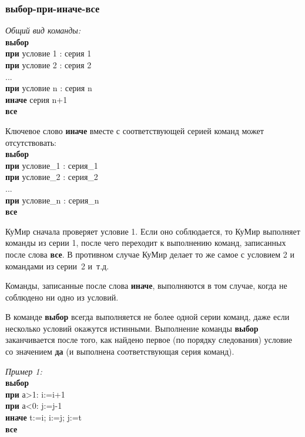 \subsubsection{выбор-при-иначе-все}

\emph{Общий вид команды:}\\
{\sffamily
\textbf{выбор}\\
\otstup \textbf{при} условие 1 : серия 1\\
\otstup \textbf{при} условие 2 : серия 2\\
\otstup ...\\
\otstup \textbf{при} условие n : серия n\\
\otstup \textbf{иначе} серия n+1\\
\textbf{все}
}

Ключевое слово \textbf{иначе} вместе с соответствующей серией команд может отсутствовать:\\
{\sffamily
\textbf{выбор}\\
\otstup \textbf{при} условие\_1 : серия\_1\\
\otstup \textbf{при} условие\_2 : серия\_2\\
\otstup ...\\
\otstup \textbf{при} условие\_n : серия\_n\\
\textbf{все}
}

КуМир сначала проверяет условие 1. Если оно соблюдается, то КуМир выполняет команды из серии 1, после чего переходит к выполнению команд, записанных после слова \textbf{все}. В противном случае КуМир делает то же самое с условием 2 и командами из серии~2 и~т.д.

Команды, записанные после слова \textbf{иначе}, выполняются в том случае, когда не соблюдено ни одно из условий.

В команде \textbf{выбор} всегда выполняется не более одной серии команд, даже если несколько условий окажутся истинными. Выполнение команды \textbf{выбор} заканчивается после того, как найдено первое (по порядку следования) условие со значением \textbf{да} (и выполнена соответствующая серия команд). 

\emph{Пример 1:}\\
{\sffamily
\textbf{выбор}\\
\otstup \textbf{при} а>1: i:=i+1\\
\otstup \textbf{при} а<0: j:=j-1\\
\otstup \textbf{иначе} t:=i; i:=j; j:=t\\
\textbf{все}
}

